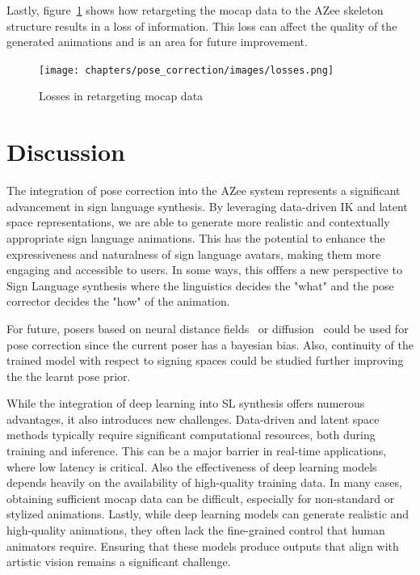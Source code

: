 \documentclass[../../main.tex]{subfiles}
\begin{document}
Lastly, figure~\ref{fig:losses} shows how retargeting the mocap data to the AZee skeleton structure results in a loss of information. This loss can affect the quality of the generated animations and is an area for future improvement.

\begin{figure}
  \centering \texttt{[image: chapters/pose\_correction/images/losses.png]}
  \caption{Losses in retargeting mocap data}
  \label{fig:losses}
\end{figure}

\section{Discussion}
\label{ch:pose_correction:discussion}

The integration of pose correction into the AZee system represents a significant advancement in sign language synthesis. By leveraging data-driven IK and latent space representations, we are able to generate more realistic and contextually appropriate sign language animations. This has the potential to enhance the expressiveness and naturalness of sign language avatars, making them more engaging and accessible to users. In some ways, this offfers a new perspective to Sign Language synthesis where the linguistics decides the "what" and the pose corrector decides the "how" of the animation.

For future, posers based on neural distance fields~\cite{tiwari2022pose} or diffusion~\cite{lu2023dposer} could be used for pose correction since the current poser has a bayesian bias. Also, continuity of the trained model with respect to signing spaces could be studied further improving the the learnt pose prior.

While the integration of deep learning into SL synthesis offers numerous advantages, it also introduces new challenges. Data-driven and latent space methods typically require significant computational resources, both during training and inference. This can be a major barrier in real-time applications, where low latency is critical. Also the effectiveness of deep learning models depends heavily on the availability of high-quality training data. In many cases, obtaining sufficient mocap data can be difficult, especially for non-standard or stylized animations. Lastly, while deep learning models can generate realistic and high-quality animations, they often lack the fine-grained control that human animators require. Ensuring that these models produce outputs that align with artistic vision remains a significant challenge.
\end{document}
